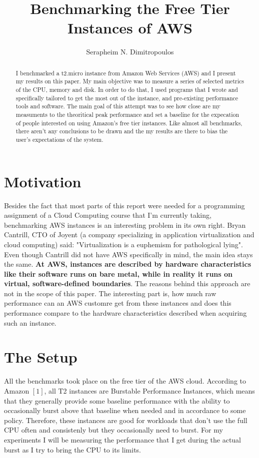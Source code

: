 \documentclass[12pt]{article}
\title{Benchmarking the Free Tier Instances of AWS}
\author{Serapheim N. Dimitropoulos}
\begin{document}
 

\maketitle

\begin{abstract}
I benchmarked a t2.micro instance from Amazon Web Services (AWS)
and I present my results on this paper. My main objective was to
measure a series of selected metrics of the CPU, memory and disk.
In order to do that, I used programs that I wrote and
specifically tailored to get the most out of the instance,
and pre-existing performance tools and software. The main goal
of this attempt was to see how close are my measuments to the
theoritical peak performance and set a baseline for the expecation
of people interested on using Amazon's free tier instances.
Like almost all benchmarks, there aren't any conclusions to
be drawn and the my results are there to bias the user's
expectations of the system.

\end{abstract}

\section{Motivation}
Besides the fact that most parts of this report were needed for
a programming assignment of a Cloud Computing course that I'm
currently taking, benchmarking AWS instances is an interesting
problem in its own right. Bryan Cantrill, CTO of Joyent (a company
specializing in application virtualization and cloud computing)
said: "Virtualization is a euphemism for pathological lying".
Even though Cantrill did not have AWS specifically in mind,
the main idea stays the same.
\textbf{At AWS, instances are described by hardware characteristics
like their software runs on bare metal, while in reality it runs
on virtual, software-defined boundaries}. The reasons behind
this approach are not in the scope of this paper. The interesting
part is, how much raw performance can an AWS customre get
from these instances and does this performance compare to the
hardware characteristics described when acquiring such an
instance.

\section{The Setup}
All the benchmarks took place on the free tier of the AWS cloud.
According to Amazon $[1]$, all T2 instances are Burstable
Performance Instances, which means that they generally provide
some baseline performance with the ability to occasionally
burst above that baseline when needed and in accordance to
some policy. Therefore, these instances are good for workloads
that don't use the full CPU often and consistenly but they
occasionally need to burst. For my experiments I will be
measuring the performance that I get during the actual
burst as I try to bring the CPU to its limits.
\end{document}
